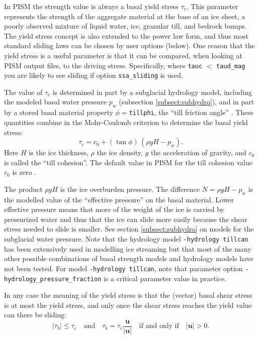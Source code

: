 In PISM the strength value is always a basal yield stress $\tau_c$.  This parameter represents the strength of the aggregate material at the base of an ice sheet, a poorly observed mixture of liquid water, ice, granular till, and bedrock bumps.  The yield stress concept is also extended to the power law form, and thus most standard sliding laws can be chosen by user options (below).  One reason that the yield stress is a useful parameter is that it can be compared, when looking at PISM output files, to the driving stress.  Specifically, where \verb|tauc| $<$ \verb|taud_mag| you are likely to see sliding if option \verb|ssa_sliding| is used.

The value of $\tau_c$ is determined in part by a subglacial hydrology model, including the modeled basal water pressure $p_w$ (subsection \ref{subsect:subhydro}), and in part by a stored basal material property $\phi=$\texttt{tillphi}, the ``till friction angle'' \cite{Paterson}.  These quantities combine in the Mohr-Coulomb criterion \cite[Chapter 8]{Paterson} to determine the basal yield stress:
\begin{equation}
   \tau_c = c_{0} + (\tan\phi)\,(\rho g H - p_w).  \label{eq:mohrcoulomb}
\end{equation}
Here $H$ is the ice thickness, $\rho$ the ice density, $g$ the acceleration of gravity, and $c_0$ is called the ``till cohesion''.  The default value in PISM for the till cohesion value $c_0$ is zero \cite[formula (2.4)]{SchoofStream}.

The product $\rho g H$ is the ice overburden pressure.  The difference $N=\rho g H - p_w$ is the modelled value of the ``effective pressure'' on the basal material.  Lower effective pressure means that more of the weight of the ice is carried by pressurized water and thus that the ice can slide more easily because the shear stress needed to slide is smaller.  See section \ref{subsect:subhydro} on models for the subglacial water pressure.  Note that the hydrology model \verb|-hydrology tillcan| has been extensively used in modelling ice streaming \cite{BBssasliding,BKAJS,Winkelmannetal2011} but that most of the many other possible combinations of basal strength models and hydrology models have not been tested.  For model \verb|-hydrology tillcan|, note that parameter option \verb|-hydrology_pressure_fraction| is  a critical parameter value in practice.

In any case the meaning of the yield stress is that the (vector) basal shear stress is at most the yield stress, and only once the shear stress reaches the yield value can there be sliding:
\begin{equation*}
   |\tau_b| \le \tau_c \quad \text{and} \quad \tau_b = \tau_c \frac{\mathbf{u}}{|\mathbf{u}|} \quad\text{if and only if}\quad |\mathbf{u}| > 0.
\end{equation*}

